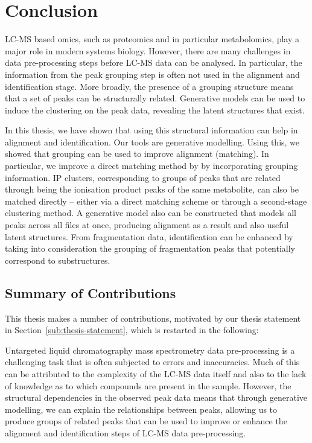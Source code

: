 \chapter{Conclusion}
\label{c:conclusion}

LC-MS based omics, such as proteomics and in particular metabolomics, play a major role in modern systems biology. However, there are many challenges in data pre-processing steps before LC-MS data can be analysed. In particular, the information from the peak grouping step is often not used in the alignment and identification stage. More broadly, the presence of a grouping structure means that a set of peaks can be structurally related. Generative models can be used to induce the clustering on the peak data, revealing the latent structures that exist. 

In this thesis, we have shown that using this structural information can help in alignment and identification. Our tools are generative modelling. Using this, we showed that grouping can be used to improve alignment (matching). In particular, we improve a direct matching method by by incorporating grouping information. IP clusters, corresponding to groups of peaks that are related through being the ionisation product peaks of the same metabolite, can also be matched directly -- either via a direct matching scheme or through a second-stage clustering method. A generative model also can be constructed that models all peaks across all files at once, producing alignment as a result and also useful latent structures. From fragmentation data, identification can be enhanced by taking into consideration the grouping of fragmentation peaks that potentially correspond to substructures.

\section{Summary of Contributions}

This thesis makes a number of contributions, motivated by our thesis statement in Section~\ref{sub:thesis-statement}, which is restarted in the following:

Untargeted liquid chromatography mass spectrometry data pre-processing is a challenging task that is often subjected to errors and inaccuracies. Much of this can be attributed to the complexity of the LC-MS data itself and also to the lack of knowledge as to which compounds are present in the sample. However, the structural dependencies in the observed peak data means that through generative modelling, we can explain the relationships between peaks, allowing us to produce groups of related peaks that can be used to improve or enhance the alignment and identification steps of LC-MS data pre-processing.

